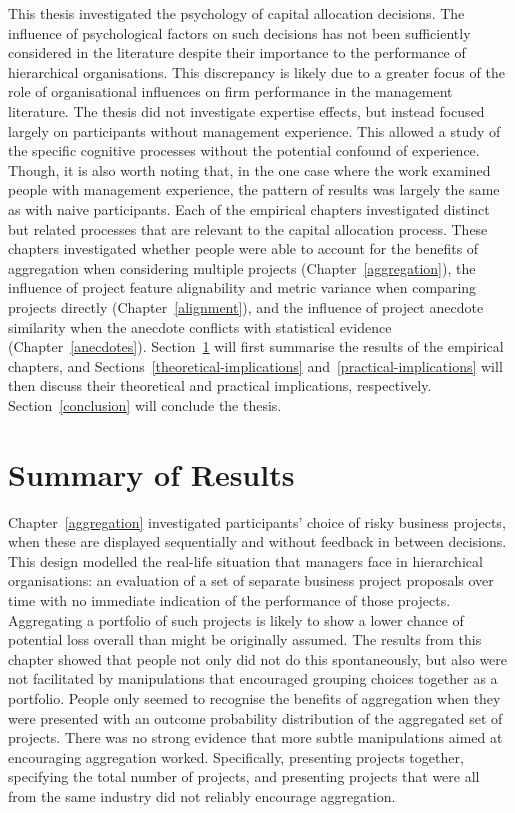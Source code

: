 \documentclass[a4paper, nobind]{templates/ociamthesis}
\theoremstyle{definition}
\theoremstyle{definition}
\theoremstyle{definition}
\theoremstyle{definition}
\theoremstyle{remark}
\begin{document}
This thesis investigated the psychology of capital allocation decisions. The
influence of psychological factors on such decisions has not been sufficiently
considered in the literature despite their importance to the performance of
hierarchical organisations. This discrepancy is likely due to a greater focus of
the role of organisational influences on firm performance in the management
literature. The thesis did not investigate expertise effects, but instead
focused largely on participants without management experience. This allowed a
study of the specific cognitive processes without the potential confound of
experience. Though, it is also worth noting that, in the one case where the work
examined people with management experience, the pattern of results was largely
the same as with naive participants. Each of the empirical chapters investigated
distinct but related processes that are relevant to the capital allocation
process. These chapters investigated whether people were able to account for the
benefits of aggregation when considering multiple projects
(Chapter~\ref{aggregation}), the influence of project feature alignability and
metric variance when comparing projects directly (Chapter~\ref{alignment}), and
the influence of project anecdote similarity when the anecdote conflicts with
statistical evidence (Chapter~\ref{anecdotes}).
Section~\ref{summary-of-results} will first summarise the results of the
empirical chapters, and Sections~\ref{theoretical-implications}
and~\ref{practical-implications} will then discuss their theoretical and
practical implications, respectively. Section~\ref{conclusion} will conclude
the thesis.

\hypertarget{summary-of-results}{%
\section{Summary of Results}\label{summary-of-results}}

Chapter~\ref{aggregation} investigated participants' choice of risky business
projects, when these are displayed sequentially and without feedback in between
decisions. This design modelled the real-life situation that managers face in
hierarchical organisations: an evaluation of a set of separate business project
proposals over time with no immediate indication of the performance of those
projects. Aggregating a portfolio of such projects is likely to show a lower
chance of potential loss overall than might be originally assumed. The results
from this chapter showed that people not only did not do this spontaneously, but
also were not facilitated by manipulations that encouraged grouping choices
together as a portfolio. People only seemed to recognise the benefits of
aggregation when they were presented with an outcome probability distribution of
the aggregated set of projects. There was no strong evidence that more subtle
manipulations aimed at encouraging aggregation worked. Specifically, presenting
projects together, specifying the total number of projects, and presenting
projects that were all from the same industry did not reliably encourage
aggregation.
\end{document}
